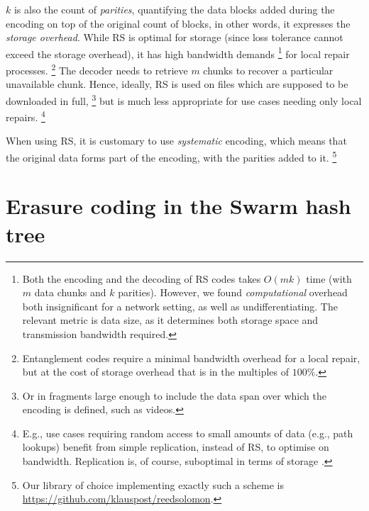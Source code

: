\documentclass[manuscript,screen,review]{acmart}
\begin{document}
$k$ is also the count of \emph{parities}, quantifying the data blocks added during the encoding on top of the original count of  blocks, in other words, it expresses the \emph{storage overhead}. While RS is optimal for storage (since loss tolerance cannot exceed the storage overhead), it has high bandwidth demands%
%
\footnote{Both the encoding and the decoding of RS codes takes $O(mk)$ time (with $m$ data chunks and $k$ parities). However, we found \emph{computational} overhead both insignificant for a network setting, as well as undifferentiating. The relevant metric is data size, as it determines both storage space and transmission bandwidth required.}
%
for local repair processes.%
%
\footnote{Entanglement codes \citep{estrada2018alpha, estrada2019building} require a minimal bandwidth overhead for a local repair, but at the cost of storage overhead that is in the multiples of $100\%$.}
%
The decoder needs to retrieve $m$ chunks to recover a particular unavailable chunk.
Hence, ideally, RS is used on files which are supposed to be downloaded in full,%
%
\footnote{Or in fragments large enough to include the data span over which the encoding is defined, such as videos.}
%
 but is much less appropriate for use cases needing only local repairs.%
%
\footnote{E.g., use cases requiring random access to small amounts of data (e.g., path lookups) benefit from simple replication, instead of RS, to optimise on bandwidth. Replication is, of course, suboptimal in terms of storage \citep{weatherspoon2002erasure}.}

When using RS, it is customary to use \emph{systematic} encoding, which means that the original data forms part of the encoding, with the parities added to it.%
%
%
\footnote{Our library of choice implementing exactly such a scheme is \url{https://github.com/klauspost/reedsolomon}.}


\section{Erasure coding in the Swarm hash tree}
\label{sec:erasure}
\end{document}

